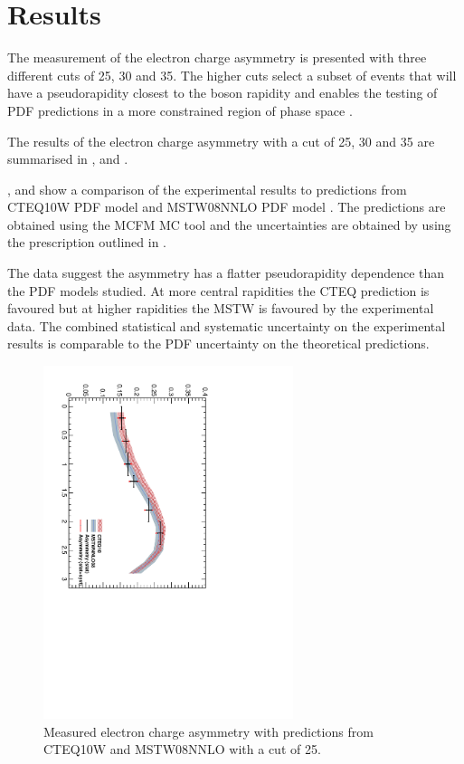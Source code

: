 \section{Results}
The measurement of the electron charge asymmetry is presented with three
different \pT cuts of 25, 30 and \unit{35}{\GeV}. 
The higher \Pt cuts select a subset of events that will have a pseudorapidity
closest to the \PW boson rapidity and enables the testing of PDF predictions in
a more constrained region of phase space \cite{asym36}.

The results of the electron charge asymmetry with a \pT cut of \unit{25}{\GeV},
\unit{30}{\GeV} and \unit{35}{\GeV} are summarised in ,
  and .

,  and  show
a comparison of the experimental results to predictions from
CTEQ10W PDF model \cite{lai2010vv} and MSTW08NNLO PDF model
\cite{martin2009parton}. The predictions are obtained using the
MCFM\cite{campbellmcfm} MC tool and the uncertainties are obtained by using the
prescription outlined in .

The data suggest the asymmetry has a flatter pseudorapidity dependence than the
PDF models studied. At more central rapidities the CTEQ prediction is favoured
but at higher rapidities the MSTW is favoured by the experimental data.
The combined statistical and systematic uncertainty on the experimental results
is comparable to the PDF uncertainty on the theoretical predictions.

\begin{figure}[htbp]
  \begin{center}
  \includegraphics*[width=0.65\textwidth,angle=90]{Asym_25}
  \caption[Measured electron charge asymmetry with a \pT cut of
\unit{25}{\GeV}]{\label{fig:asym25} Measured electron charge asymmetry with
predictions from CTEQ10W and MSTW08NNLO with a \pT cut of
\unit{25}{\GeV}\cite{baisini2010electron}.}
  \end{center}
\end{figure}

